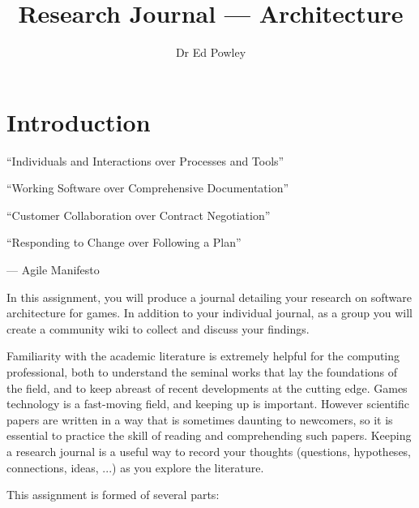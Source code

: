 \documentclass{../fal_assignment}
\title{Research Journal --- Architecture}
\author{Dr Ed Powley}
\begin{document}
\maketitle

\section*{Introduction}

\begin{marginquote}
  ``Individuals and Interactions over Processes and Tools''
  
  ``Working Software over Comprehensive Documentation''
  
  ``Customer Collaboration over Contract Negotiation''
  
  ``Responding to Change over Following a Plan''
    
    --- Agile Manifesto
\end{marginquote}

In this assignment, you will produce a journal detailing your research on software architecture for games.
In addition to your individual journal, as a group you will create a community wiki to collect and discuss your findings.

Familiarity with the academic literature is extremely helpful for the computing professional,
both to understand the seminal works that lay the foundations of the field,
and to keep abreast of recent developments at the cutting edge.
Games technology is a fast-moving field, and keeping up is important.
However scientific papers are written in a way that is sometimes daunting to newcomers,
so it is essential to practice the skill of reading and comprehending such papers.
Keeping a research journal is a useful way to record your thoughts
(questions, hypotheses, connections, ideas, ...) as you explore the literature.

This assignment is formed of several parts:
\end{document}
